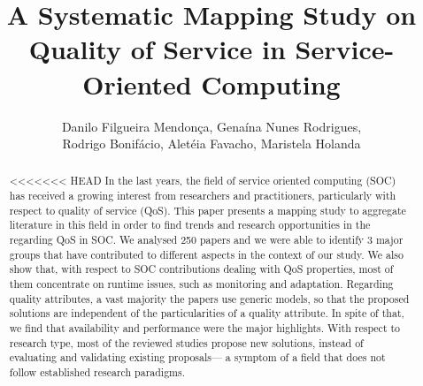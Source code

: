 \documentclass[12pt]{article}
\title{A Systematic Mapping Study on Quality of Service in Service-Oriented Computing}
\author{Danilo Filgueira Mendon\c{c}a\inst{1}, Gena\'{i}na Nunes Rodrigues\inst{1}, \\ Rodrigo Bonif\'{a}cio\inst{1}, Alet\'{e}ia Favacho\inst{1}, Maristela Holanda\inst{1} }
\begin{document}
 

\maketitle

\begin{abstract}
<<<<<<< HEAD
  In the last years, the field of service oriented computing (SOC) has received a growing interest from researchers and practitioners, particularly with respect to quality of service (QoS). This paper presents a mapping study to aggregate literature in this field in order to find trends and research opportunities in the regarding QoS in SOC. We analysed 250 papers and we were able to identify 3 major groups that have contributed to different aspects in the context of our study. We also show that, with respect to SOC contributions dealing with QoS properties, most of them concentrate on runtime issues, such as monitoring and adaptation. Regarding quality attributes, a vast majority the papers use generic models, so that the proposed solutions are independent of the particularities of a quality attribute. In spite of that, we find that availability and performance were the major highlights. With respect to research type, most of the reviewed studies propose new solutions, instead of evaluating and validating existing proposals--- a symptom of a field that does not follow established research paradigms.
\end{abstract}
\end{document}
